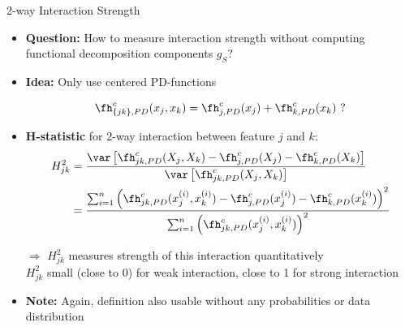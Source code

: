 \documentclass[11pt,compress,t,notes=noshow, aspectratio=169, xcolor=table]{beamer}
\begin{document}
\begin{frame}{2-way Interaction Strength}
\begin{itemize}[<+->]
    \item \textbf{Question:} How to measure interaction strength without computing functional decomposition components $g_S$?
    \item \textbf{Idea:} Only use centered PD-functions

    $$
    \fh_{\{jk\}, PD}^c(x_j, x_k)
            = \fh^c_{j, PD}(x_j) + \fh^c_{k, PD}(x_k) \text{ ?}
    $$
    
    \item \textbf{H-statistic} for 2-way interaction between feature $j$ and $k$:
    \begin{align*}
    H^2_{jk}
    & = \frac{
        \var \left[ \fh^c_{jk,PD}(X_j, X_k) - \fh^c_{j, PD}(X_j) - \fh^c_{k, PD}(X_k) \right]
    }{ \var \left[ \fh^c_{jk,PD}(X_j, X_k) \right] } \\
    & = \frac{
        \sum_{i=1}^n \left( \fh^c_{jk,PD}(x_j^{(i)}, x_k^{(i)})
        - \fh^c_{j, PD}(x_j^{(i)}) - \fh^c_{k, PD}(x_k^{(i)}) \right)^2
    }{
        \sum_{i=1}^n \left( \fh^c_{jk,PD}(x_j^{(i)}, x_k^{(i)}) \right)^2
    }
    \end{align*}
    \item[$\Rightarrow$]
    $H^2_{jk}$ measures strength of this interaction quantitatively \\
    $H^2_{jk}$ small (close to 0) for weak interaction, close to 1 for strong interaction
    \item \textbf{Note:} Again, definition also usable without any probabilities or data distribution
\end{itemize}




\end{frame}
\end{document}
